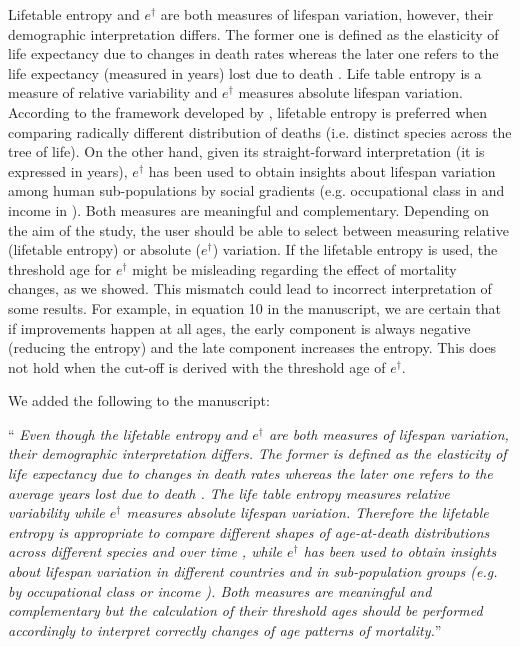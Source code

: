 \documentclass[a4paper,twoside, openright, 12pt, leqno]{article}
\begin{document}
Lifetable entropy and $e^\dagger$ are both measures of lifespan variation, however, their demographic interpretation differs. The former one is defined as the elasticity of life expectancy due to changes in death rates \citep{keyfitz1968introduction} whereas the later one refers to the life expectancy (measured in years) lost due to death \citep{Vaupel1986}. Life table entropy is a measure of relative variability and $e^\dagger$ measures absolute lifespan variation. According to the framework developed by \citet{Wrycza2015}, lifetable entropy is preferred when comparing radically different distribution of deaths (i.e. distinct species across the tree of life). On the other hand, given its straight-forward interpretation (it is expressed in years), $e^\dagger$ has been used to obtain insights about lifespan variation among human sub-populations by social gradients (e.g. occupational class in \citet{vanRaalte2014} and income in \citet{bronnum2017socially}). Both measures are  meaningful and complementary. Depending on the aim of the study, the user should be able to select between measuring relative (lifetable entropy) or absolute ($e^\dagger$) variation. If the lifetable entropy is used, the threshold age for $e^\dagger$ might be misleading regarding the effect of mortality changes, as we showed. This mismatch could lead to incorrect interpretation of some results. For example, in equation 10 in the manuscript, we are certain that if improvements happen at all ages, the early component is always negative (reducing the entropy) and the late component increases the entropy. This does not hold when the cut-off is derived with the threshold age of $e^\dagger$.\linebreak


We added the following to the manuscript:
\linebreak

`` \textit{Even though the lifetable entropy and $e^\dagger$ are both measures of lifespan variation, their demographic interpretation differs. The former is defined as the elasticity of life expectancy due to changes in death rates \citep{keyfitz1968introduction} whereas the later one refers to the average years lost due to death \citep{Vaupel2011}. The life table entropy measures relative variability while $e^\dagger$ measures absolute lifespan variation. Therefore the lifetable entropy is appropriate to compare different shapes of age-at-death distributions across different species and over time \citep{baudisch2013pace,Wrycza2015}, while $e^\dagger$ has been used to obtain insights about lifespan variation in different countries and in sub-population groups (e.g. by occupational class or income \citep{vanRaalte2014,bronnum2017socially}). Both measures are meaningful and complementary but the calculation of their threshold ages should be performed accordingly to interpret correctly changes of age patterns of mortality.}''
\linebreak
\end{document}
